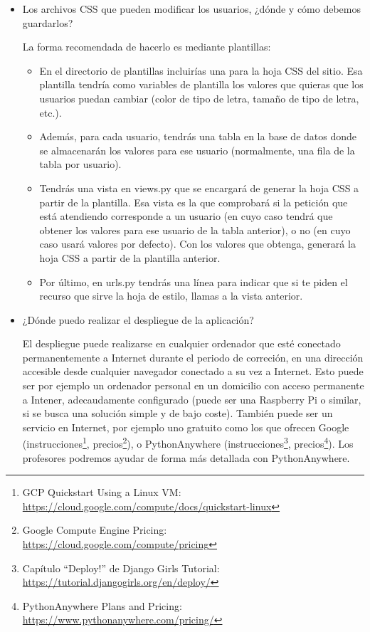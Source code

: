 \begin{itemize}
\item Los archivos CSS que pueden modificar los usuarios, ¿dónde y cómo debemos guardarlos?

  La forma recomendada de hacerlo es mediante plantillas:

  \begin{itemize}
  \item En el directorio de plantillas incluirías una para la hoja CSS del sitio. Esa plantilla tendría como variables de plantilla los valores que quieras que los usuarios puedan cambiar (color de tipo de letra, tamaño de tipo de letra, etc.).
  \item Además, para cada usuario, tendrás una tabla en la base de datos donde se almacenarán los valores para ese usuario (normalmente, una fila de la tabla por usuario).
  \item Tendrás una vista en views.py que se encargará de generar la hoja CSS a partir de la plantilla. Esa vista es la que comprobará si la petición que está atendiendo corresponde a un usuario (en cuyo caso tendrá que obtener los valores para ese usuario de la tabla anterior), o no (en cuyo caso usará valores por defecto). Con los valores que obtenga, generará la hoja CSS a partir de la plantilla anterior.
  \item Por último, en urls.py tendrás una línea para indicar que si te piden el recurso que sirve la hoja de estilo, llamas a la vista anterior.
  \end{itemize}

\item ¿Dónde puedo realizar el despliegue de la aplicación?

  El despliegue puede realizarse en cualquier ordenador que esté conectado permanentemente a Internet durante el periodo de correción, en una dirección accesible desde cualquier navegador conectado a su vez a Internet. Esto puede ser por ejemplo un ordenador personal en un domicilio con acceso permanente a Intener, adecaudamente configurado (puede ser una Raspberry Pi o similar, si se busca una solución simple y de bajo coste). También puede ser un servicio en Internet, por ejemplo uno gratuito como los que ofrecen Google (instrucciones\footnote{GCP Quickstart Using a Linux VM:\\ \url{https://cloud.google.com/compute/docs/quickstart-linux}}, precios\footnote{Google Compute Engine Pricing:\\ \url{https://cloud.google.com/compute/pricing}}), o PythonAnywhere (instrucciones\footnote{Capítulo ``Deploy!'' de Django Girls Tutorial:\\ \url{https://tutorial.djangogirls.org/en/deploy/}}, precios\footnote{PythonAnywhere Plans and Pricing:\\ \url{https://www.pythonanywhere.com/pricing/}}). Los profesores podremos ayudar de forma más detallada con PythonAnywhere.

\end{itemize}

